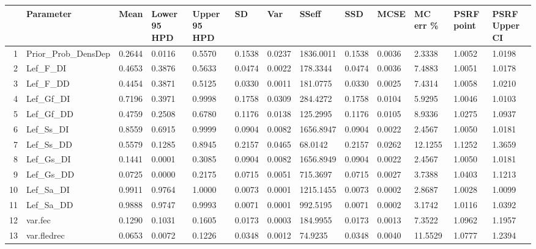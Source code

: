 \begin{table}[ht]
\centering
\begin{tabular}{rllllllllllll}
  \hline
 & Parameter & Mean & Lower 95 HPD & Upper 95 HPD & SD & Var & SSeff & SSD & MCSE & MC err \% & PSRF point & PSRF Upper CI \\ 
  \hline
1 & Prior\_Prob\_DensDep &   0.2644 &   0.0116 &   0.5570 &  0.1538 &    0.0237 & 1836.0011 &  0.1538 & 0.0036 &  2.3338 & 1.0052 & 1.0198 \\ 
  2 & Lef\_F\_DI &   0.4653 &   0.3876 &   0.5633 &  0.0474 &    0.0022 &  178.3344 &  0.0474 & 0.0036 &  7.4883 & 1.0051 & 1.0178 \\ 
  3 & Lef\_F\_DD &   0.4454 &   0.3871 &   0.5125 &  0.0330 &    0.0011 &  181.0775 &  0.0330 & 0.0025 &  7.4314 & 1.0058 & 1.0210 \\ 
  4 & Lef\_Gf\_DI &   0.7196 &   0.3971 &   0.9998 &  0.1758 &    0.0309 &  284.4272 &  0.1758 & 0.0104 &  5.9295 & 1.0046 & 1.0103 \\ 
  5 & Lef\_Gf\_DD &   0.4759 &   0.2508 &   0.6780 &  0.1176 &    0.0138 &  125.2995 &  0.1176 & 0.0105 &  8.9336 & 1.0275 & 1.0937 \\ 
  6 & Lef\_Ss\_DI &   0.8559 &   0.6915 &   0.9999 &  0.0904 &    0.0082 & 1656.8947 &  0.0904 & 0.0022 &  2.4567 & 1.0050 & 1.0181 \\ 
  7 & Lef\_Ss\_DD &   0.5579 &   0.1285 &   0.8945 &  0.2157 &    0.0465 &   68.0142 &  0.2157 & 0.0262 & 12.1255 & 1.1252 & 1.3659 \\ 
  8 & Lef\_Gs\_DI &   0.1441 &   0.0001 &   0.3085 &  0.0904 &    0.0082 & 1656.8949 &  0.0904 & 0.0022 &  2.4567 & 1.0050 & 1.0181 \\ 
  9 & Lef\_Gs\_DD &   0.0725 &   0.0000 &   0.2175 &  0.0715 &    0.0051 &  715.3697 &  0.0715 & 0.0027 &  3.7388 & 1.0403 & 1.1213 \\ 
  10 & Lef\_Sa\_DI &   0.9911 &   0.9764 &   1.0000 &  0.0073 &    0.0001 & 1215.1455 &  0.0073 & 0.0002 &  2.8687 & 1.0028 & 1.0099 \\ 
  11 & Lef\_Sa\_DD &   0.9888 &   0.9747 &   0.9993 &  0.0071 &    0.0001 &  992.5195 &  0.0071 & 0.0002 &  3.1742 & 1.0116 & 1.0392 \\ 
  12 & var.fec &   0.1290 &   0.1031 &   0.1605 &  0.0173 &    0.0003 &  184.9955 &  0.0173 & 0.0013 &  7.3522 & 1.0962 & 1.1957 \\ 
  13 & var.fledrec &   0.0653 &   0.0072 &   0.1226 &  0.0348 &    0.0012 &   74.9235 &  0.0348 & 0.0040 & 11.5529 & 1.0777 & 1.2394 \\ 

\end{tabular}
\end{table}
